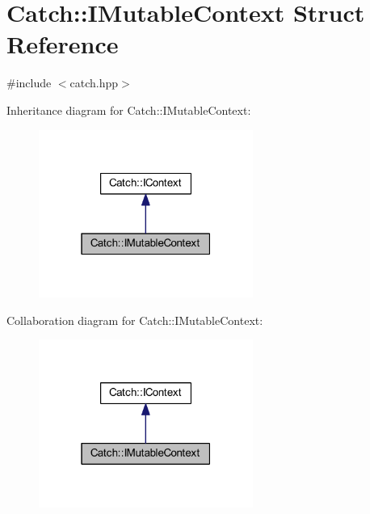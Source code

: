 \hypertarget{struct_catch_1_1_i_mutable_context}{}\section{Catch\+:\+:I\+Mutable\+Context Struct Reference}
\label{struct_catch_1_1_i_mutable_context}


{\ttfamily \#include $<$catch.\+hpp$>$}



Inheritance diagram for Catch\+:\+:I\+Mutable\+Context\+:\nopagebreak
\begin{figure}[H]
\begin{center}
\leavevmode
\includegraphics[width=199pt]{struct_catch_1_1_i_mutable_context__inherit__graph}
\end{center}
\end{figure}


Collaboration diagram for Catch\+:\+:I\+Mutable\+Context\+:\nopagebreak
\begin{figure}[H]
\begin{center}
\leavevmode
\includegraphics[width=199pt]{struct_catch_1_1_i_mutable_context__coll__graph}
\end{center}
\end{figure}
